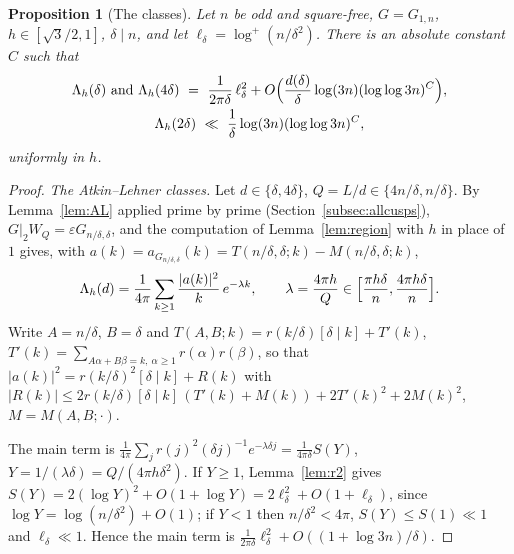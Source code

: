 ﻿\documentclass[11pt]{amsart}
\newtheorem{proposition}[theorem]{Proposition}
\theoremstyle{remark}
\newcommand{\e}{\varepsilon}
\begin{document}
\begin{proposition}[The classes]\label{prop:classes}
Let $n$ be odd and square-free, $G=G_{1,n}$, $h\in[\sqrt3/2,1]$, $\delta\mid n$, and let $\ell_\delta=\log^+(n/\delta^2)$. There is an absolute constant $C$ such that
\begin{gather*}
\Lambda_h(\delta)\ \text{and}\ \Lambda_h(4\delta)\ =\ \frac1{2\pi\delta}\,\ell_\delta^2+O\Bigl(\frac{d(\delta)}\delta\log(3n)(\log\log3n)^{C}\Bigr),\\
\Lambda_h(2\delta)\ \ll\ \frac{1}{\delta}\log(3n)(\log\log3n)^{C},
\end{gather*}
uniformly in $h$.
\end{proposition}
\begin{proof}
\emph{The Atkin--Lehner classes.} Let $d\in\{\delta,4\delta\}$, $Q=L/d\in\{4n/\delta,n/\delta\}$. By Lemma~\ref{lem:AL} applied prime by prime (Section~\ref{subsec:allcusps}), $G|_2W_Q=\e G_{n/\delta,\delta}$, and the computation of Lemma~\ref{lem:region} with $h$ in place of $1$ gives, with $a(k)=a_{G_{n/\delta,\delta}}(k)=T(n/\delta,\delta;k)-M(n/\delta,\delta;k)$,
\[
\Lambda_h(d)=\frac1{4\pi}\sum_{k\ge1}\frac{|a(k)|^2}k\,e^{-\lambda k},\qquad\lambda=\frac{4\pi h}Q\in\Bigl[\frac{\pi h\delta}n,\frac{4\pi h\delta}n\Bigr].
\]
Write $A=n/\delta$, $B=\delta$ and $T(A,B;k)=r(k/\delta)[\delta\mid k]+T'(k)$, $T'(k)=\sum_{A\alpha+B\beta=k,\ \alpha\ge1}r(\alpha)r(\beta)$, so that $|a(k)|^2=r(k/\delta)^2[\delta\mid k]+R(k)$ with $|R(k)|\le2r(k/\delta)[\delta\mid k]\,(T'(k)+M(k))+2T'(k)^2+2M(k)^2$, $M=M(A,B;\cdot)$.

The main term is $\frac1{4\pi}\sum_j r(j)^2(\delta j)^{-1}e^{-\lambda\delta j}=\frac1{4\pi\delta}S(Y)$, $Y=1/(\lambda\delta)=Q/(4\pi h\delta^2)$. If $Y\ge1$, Lemma~\ref{lem:r2} gives $S(Y)=2(\log Y)^2+O(1+\log Y)=2\ell_\delta^2+O(1+\ell_\delta)$, since $\log Y=\log(n/\delta^2)+O(1)$; if $Y<1$ then $n/\delta^2<4\pi$, $S(Y)\le S(1)\ll1$ and $\ell_\delta\ll1$. Hence the main term is $\frac1{2\pi\delta}\ell_\delta^2+O((1+\log 3n)/\delta)$.


\end{proof}
\end{document}
